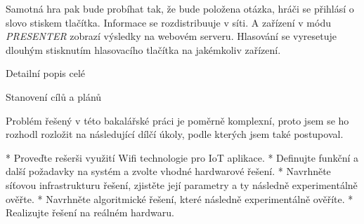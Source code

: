 Samotná hra pak bude probíhat tak, že bude položena otázka, hráči se přihlásí o slovo stiskem tlačítka. Informace se rozdistribuuje v síti. A zařízení v módu {\em PRESENTER} zobrazí výsledky na webovém serveru. Hlasování se vyresetuje dlouhým stisknutím hlasovacího tlačítka na jakémkoliv zařízení.

Detailní popis celé

\sec Stanovení cílů a plánů

Problém řešený v této bakalářské práci je poměrně komplexní, proto jsem se ho rozhodl rozložit na následující dílčí úkoly, podle kterých jsem také postupoval.

\begitems
* Proveďte rešerši využití Wifi technologie pro IoT aplikace.
* Definujte funkční a další požadavky na systém a zvolte vhodné hardwarové řešení.
* Navrhněte síťovou infrastrukturu řešení, zjistěte její parametry a ty následně experimentálně ověřte.
* Navrhněte algoritmické řešení, které následně experimentálně ověříte.
* Realizujte řešení na reálném hardwaru. 

\enditems